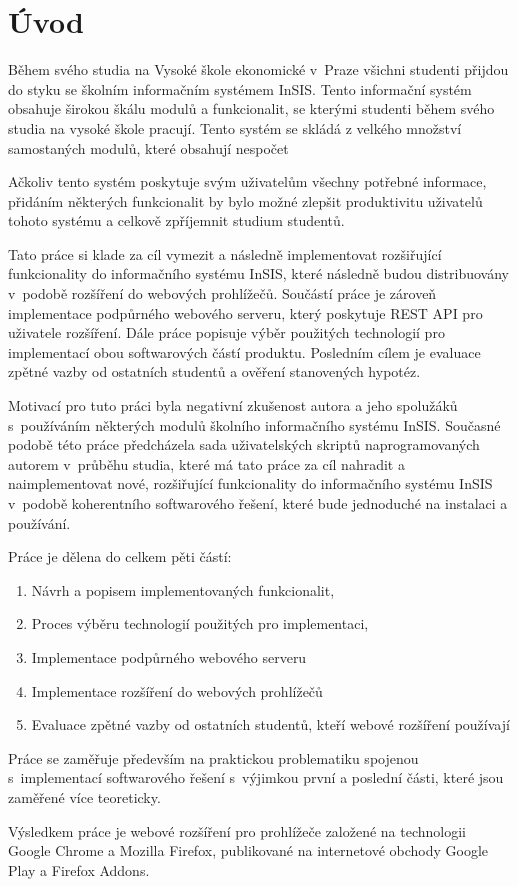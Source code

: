 \chapter*{Úvod}

Během svého studia na Vysoké škole ekonomické v~Praze všichni studenti přijdou do styku se školním informačním systémem InSIS. Tento informační systém obsahuje širokou škálu modulů a funkcionalit, se kterými studenti během svého studia na vysoké škole pracují. Tento systém se skládá z velkého množství samostaných modulů, které obsahují nespočet 

Ačkoliv tento systém poskytuje svým uživatelům všechny potřebné informace, přidáním některých funkcionalit by bylo možné zlepšit produktivitu uživatelů tohoto systému a celkově zpříjemnit studium studentů.

Tato práce si klade za cíl vymezit a následně implementovat rozšiřující funkcionality do informačního systému InSIS, které následně budou distribuovány v~podobě rozšíření do webových prohlížečů. Součástí práce je zároveň implementace podpůrného webového serveru, který poskytuje REST API pro uživatele rozšíření. Dále práce popisuje výběr použitých technologií pro implementací obou softwarových částí produktu. Posledním cílem je evaluace zpětné vazby od ostatních studentů a ověření stanovených hypotéz.

Motivací pro tuto práci byla negativní zkušenost autora a jeho spolužáků s~používáním některých modulů školního informačního systému InSIS. 
Současné podobě této práce předcházela sada uživatelských skriptů naprogramovaných autorem v~průběhu studia, které má tato práce za cíl nahradit a naimplementovat nové, rozšiřující funkcionality do informačního systému InSIS v~podobě koherentního softwarového řešení, které bude jednoduché na instalaci a používání.

Práce je dělena do celkem pěti částí: 

\begin{enumerate}
    \item Návrh a popisem implementovaných funkcionalit,
    \item Proces výběru technologií použitých pro implementaci,
    \item Implementace podpůrného webového serveru
    \item Implementace rozšíření do webových prohlížečů
    \item Evaluace zpětné vazby od ostatních studentů, kteří webové rozšíření používají
\end{enumerate}

Práce se zaměřuje především na praktickou problematiku spojenou s~implementací softwarového řešení s~výjimkou první a poslední části, které jsou zaměřené více teoreticky.

Výsledkem práce je webové rozšíření pro prohlížeče založené na technologii Google Chrome a Mozilla Firefox, publikované na internetové obchody Google Play a Firefox Addons. 
